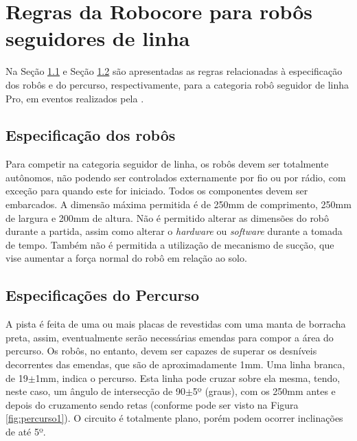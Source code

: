 \vspace{1cm}
\section{Regras da Robocore para robôs seguidores de linha} \label{cap:regras_comp}

Na Seção \ref{cap:espc_robocore} e Seção \ref{cap:perc_robocore} são apresentadas as regras relacionadas à 
especificação dos robôs e do percurso, respectivamente, 
para a categoria robô seguidor de linha Pro, em eventos realizados pela .

\vspace{1cm}
\subsection{Especificação dos robôs} \label{cap:espc_robocore}

Para competir na categoria seguidor de linha, os robôs devem ser totalmente autônomos, não podendo ser controlados 
externamente por fio ou por rádio, com exceção para quando este for iniciado. Todos os componentes devem ser embarcados. A 
dimensão máxima permitida é de 250mm   de   comprimento,   250mm   de   largura   e   200mm   de   altura. Não é 
permitido alterar as dimensões do robô durante a partida, assim como alterar o \textit{hardware} ou \textit{software} 
durante a tomada de tempo. Também não é permitida a utilização de mecanismo de sucção, 
que vise aumentar a força normal do robô em relação ao solo.

\vspace{1cm}
\subsection{Especificações do Percurso} \label{cap:perc_robocore}

A pista é feita de uma ou mais placas de  revestidas com uma manta de 
borracha preta, assim, eventualmente serão necessárias emendas para compor a área do percurso. Os robôs, no entanto, 
devem ser capazes de superar os desníveis decorrentes das emendas, que são de aproximadamente 1mm.
Uma linha branca, de 19$\pm$1mm, indica o percurso. Esta linha pode cruzar sobre ela mesma, tendo, neste caso, 
um ângulo de intersecção de 90$\pm$5º (graus), com os 250mm antes e depois do cruzamento sendo retas (conforme pode 
ser visto na Figura \ref{fig:percurso1}). O circuito é totalmente plano, porém podem ocorrer 
inclinações de até 5º.\par



